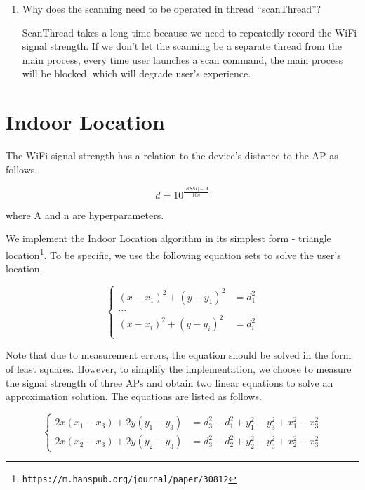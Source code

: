 \begin{enumerate}
  \item Why does the scanning need to be operated in thread ``scanThread''?
  
  ScanThread takes a long time because we need to repeatedly record the WiFi signal strength. If we don't let the scanning be a separate thread from the main process, every time user launches a scan command, the main process will be blocked, which will degrade user's experience.
  

\end{enumerate}


\section{Indoor Location}

The WiFi signal strength has a relation to the device's distance to the AP as follows.

\begin{equation}
  d=10^{\frac{|RSSI| - A}{10n}}
\end{equation}

where A and n are hyperparameters.

We implement the Indoor Location algorithm in its simplest form - triangle location\footnote{\texttt{https://m.hanspub.org/journal/paper/30812}}. To be specific, we use the following equation sets to solve the user's location.

\begin{equation}
  \left\{
  \begin{array}{rl}
    (x-x_1)^2 + (y-y_1)^2 &= d_1^2 \\
    \ldots \\
    (x-x_i)^2 + (y-y_i)^2 &= d_i^2 \\
  \end{array}  
  \right.
\end{equation}

Note that due to measurement errors, the equation should be solved in the form of least squares. However, to simplify the implementation, we choose to measure the signal strength of three APs and obtain two linear equations to solve an approximation solution. The equations are listed as follows.

\begin{equation}
  \left\{
    \begin{array}{rl}
      2x(x_1-x_3) + 2y(y_1-y_3) &= d_3^2-d_1^2+y_1^2-y_3^2+x_1^2-x_3^2 \\
      2x(x_2-x_3)+2y(y_2-y_3)&=d_3^2-d_2^2+y_2^2-y_3^2+x_2^2-x_3^2
    \end{array}
    \right.
\end{equation}

